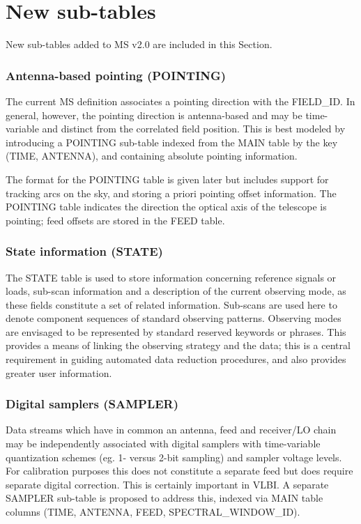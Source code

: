 \documentclass{article}
\begin{document}
\section{New sub-tables}

New sub-tables added to MS v2.0 are included in this Section.

\subsubsection{Antenna-based pointing (POINTING)}

The current MS definition associates a pointing direction with the
FIELD\_ID. In general, however, the pointing direction is
antenna-based and may be time-variable and distinct from the
correlated field position. This is best modeled by introducing a
POINTING sub-table indexed from the MAIN table by the key (TIME,
ANTENNA), and containing absolute pointing information.

The format for the POINTING table is given later but includes support
for tracking arcs on the sky, and storing a priori pointing offset
information. The POINTING table indicates the direction the optical
axis of the telescope is pointing; feed offsets are stored in the FEED
table.

\subsubsection{State information (STATE)}

The STATE table is used to store information concerning reference
signals or loads, sub-scan information and a description of the
current observing mode, as these fields constitute a set of related
information. Sub-scans are used here to denote component sequences of
standard observing patterns. Observing modes are envisaged to be
represented by standard reserved keywords or phrases. This provides a
means of linking the observing strategy and the data; this is a
central requirement in guiding automated data reduction procedures,
and also provides greater user information.

\subsubsection{Digital samplers (SAMPLER)}

Data streams which have in common an antenna, feed and receiver/LO
chain may be independently associated with digital samplers with
time-variable quantization schemes (eg. 1- versus 2-bit sampling) and
sampler voltage levels. For calibration purposes this does not
constitute a separate feed but does require separate digital
correction. This is certainly important in VLBI. A separate SAMPLER
sub-table is proposed to address this, indexed via MAIN
table columns (TIME, ANTENNA, FEED, SPECTRAL\_WINDOW\_ID).
\end{document}
